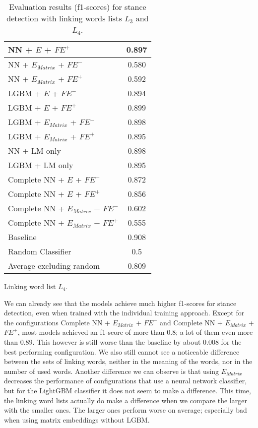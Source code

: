 \begin{table}[h]
\begin{subtable}{.5\textwidth}
\begin{tabular}{|| l || c ||}
 			\hline
 			NN + $E$ + $\textit{FE}^+$ & 0.897 \\
 			\hline
 			NN + $E_{Matrix}$ + $\textit{FE}^-$ & 0.580 \\
 			\hline
 			NN + $E_{Matrix}$ + $\textit{FE}^+$ & 0.592 \\
 			\hline
 			LGBM + $E$ + $\textit{FE}^-$ & 0.894 \\
 			\hline
 			LGBM + $E$ + $\textit{FE}^+$ & 0.899 \\
 			\hline
 			LGBM + $E_{Matrix}$ + $\textit{FE}^-$ & 0.898 \\
 			\hline
 			LGBM + $E_{Matrix}$ + $\textit{FE}^+$ & 0.895 \\
 			\hline
 			NN + LM only & 0.898 \\
 			\hline
 			LGBM + LM only & 0.895 \\
 			\hline
 			Complete NN + $E$ + $\textit{FE}^-$ & 0.872 \\
 			\hline
 			Complete NN + $E$ + $\textit{FE}^+$ & 0.856 \\
 			\hline
 			Complete NN + $E_{Matrix}$ + $\textit{FE}^-$ & 0.602 \\
 			\hline
 			Complete NN + $E_{Matrix}$ + $\textit{FE}^+$ & 0.555 \\
 			\hline
 			Baseline & 0.908 \\
 			\hline
 			Random Classifier & 0.5 \\
 			\hline
 			\hline
 			Average excluding random & 0.809 \\
 			\hline
		\end{tabular}
		\renewcommand{\arraystretch}{1}
  		\caption{Linking word list $L_4$.}%
  	\end{subtable}
  	\caption{Evaluation results (f1-scores) for stance detection with linking words lists $L_3$ and $L_4$.}%
  	\label{fig:stanceresults2}
\end{table}

We can already see that the models achieve much higher f1-scores for stance detection, even when trained with the individual training approach. Except for the configurations Complete NN + $E_{Matrix}$ + $\textit{FE}^-$ and Complete NN + $E_{Matrix}$ + $\textit{FE}^+$, most models achieved an f1-score of more than $0.8$; a lot of them even more than $0.89$. This however is still worse than the baseline by about $0.008$ for the best performing configuration. We also still cannot see a noticeable difference between the sets of linking words, neither in the meaning of the words, nor in the number of used words. Another difference we can observe is that using $E_{Matrix}$ decreases the performance of configurations that use a neural network classifier, but for the LightGBM classifier it does not seem to make a difference. This time, the linking word lists actually do make a difference when we compare the larger with the smaller ones. The larger ones perform worse on average; especially bad when using matrix embeddings without LGBM. \\

